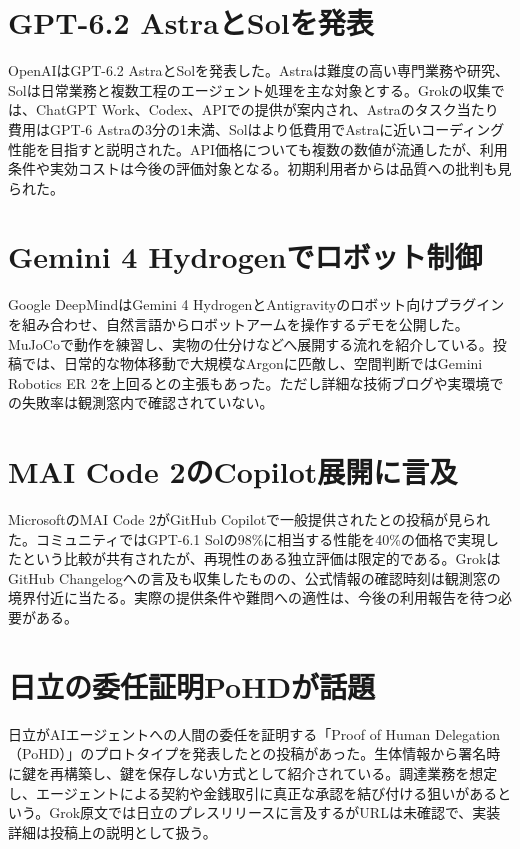 \section{GPT-6.2 AstraとSolを発表}
OpenAIはGPT-6.2 AstraとSolを発表した。Astraは難度の高い専門業務や研究、Solは日常業務と複数工程のエージェント処理を主な対象とする。Grokの収集では、ChatGPT Work、Codex、APIでの提供が案内され、Astraのタスク当たり費用はGPT-6 Astraの3分の1未満、Solはより低費用でAstraに近いコーディング性能を目指すと説明された。API価格についても複数の数値が流通したが、利用条件や実効コストは今後の評価対象となる。初期利用者からは品質への批判も見られた。

\section{Gemini 4 Hydrogenでロボット制御}
Google DeepMindはGemini 4 HydrogenとAntigravityのロボット向けプラグインを組み合わせ、自然言語からロボットアームを操作するデモを公開した。MuJoCoで動作を練習し、実物の仕分けなどへ展開する流れを紹介している。投稿では、日常的な物体移動で大規模なArgonに匹敵し、空間判断ではGemini Robotics ER 2を上回るとの主張もあった。ただし詳細な技術ブログや実環境での失敗率は観測窓内で確認されていない。

\section{MAI Code 2のCopilot展開に言及}
MicrosoftのMAI Code 2がGitHub Copilotで一般提供されたとの投稿が見られた。コミュニティではGPT-6.1 Solの98\%に相当する性能を40\%の価格で実現したという比較が共有されたが、再現性のある独立評価は限定的である。GrokはGitHub Changelogへの言及も収集したものの、公式情報の確認時刻は観測窓の境界付近に当たる。実際の提供条件や難問への適性は、今後の利用報告を待つ必要がある。

\section{日立の委任証明PoHDが話題}
日立がAIエージェントへの人間の委任を証明する「Proof of Human Delegation（PoHD）」のプロトタイプを発表したとの投稿があった。生体情報から署名時に鍵を再構築し、鍵を保存しない方式として紹介されている。調達業務を想定し、エージェントによる契約や金銭取引に真正な承認を結び付ける狙いがあるという。Grok原文では日立のプレスリリースに言及するがURLは未確認で、実装詳細は投稿上の説明として扱う。

